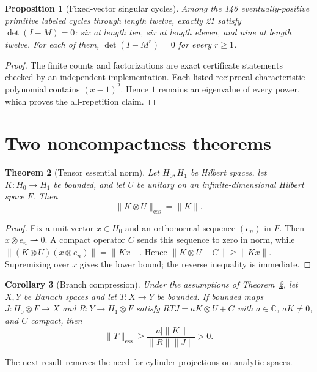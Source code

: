 \documentclass[11pt]{article}
\newtheorem{theorem}{Theorem}[section]
\newtheorem{proposition}[theorem]{Proposition}
\newtheorem{corollary}[theorem]{Corollary}
\theoremstyle{remark}
\newcommand{\ess}{\mathrm{ess}}
\begin{document}
\begin{proposition}[Fixed-vector singular cycles]\label{prop:singular}
Among the 146 eventually-positive primitive labeled cycles through length twelve,
exactly 21 satisfy $\det(I-M)=0$: six at length ten, six at length eleven, and
nine at length twelve.  For each of them,
$\det(I-M^r)=0$ for every $r\ge1$.
\end{proposition}

\begin{proof}
The finite counts and factorizations are exact certificate statements checked
by an independent implementation.  Each listed reciprocal characteristic
polynomial contains $(x-1)^2$.  Hence $1$ remains an eigenvalue of every power,
which proves the all-repetition claim.
\end{proof}

\section{Two noncompactness theorems}

\begin{theorem}[Tensor essential norm]\label{thm:tensor}
Let $H_0,H_1$ be Hilbert spaces, let $K:H_0\to H_1$ be bounded, and let $U$
be unitary on an infinite-dimensional Hilbert space $F$.  Then
\[
 \|K\otimes U\|_{\ess}=\|K\|.
\]
\end{theorem}

\begin{proof}
Fix a unit vector $x\in H_0$ and an orthonormal sequence $(e_n)$ in $F$.
Then $x\otimes e_n\rightharpoonup0$.  A compact operator $C$ sends this
sequence to zero in norm, while
$\|(K\otimes U)(x\otimes e_n)\|=\|Kx\|$.  Hence
$\|K\otimes U-C\|\ge\|Kx\|$.  Supremizing over $x$ gives the lower bound;
the reverse inequality is immediate.
\end{proof}

\begin{corollary}[Branch compression]\label{cor:branch}
Under the assumptions of Theorem~\ref{thm:tensor}, let $X,Y$ be Banach
spaces and let $T:X\to Y$ be bounded.  If bounded maps
$J:H_0\otimes F\to X$ and $R:Y\to H_1\otimes F$ satisfy
$RTJ=aK\otimes U+C$ with $a\in\mathbb C$, $aK\ne0$, and $C$ compact, then
\[
 \|T\|_{\ess}\ge
 \frac{|a|\|K\|}{\|R\|\|J\|}>0.
\]
\end{corollary}

The next result removes the need for cylinder projections on analytic spaces.
\end{document}
